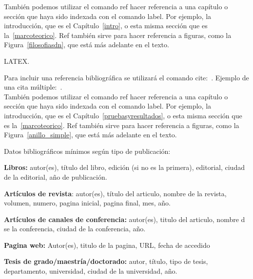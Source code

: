 \documentclass[12pt,a4paper,oneside]{book}
\begin{document}
También podemos utilizar el comando ref hacer referencia a una capítulo o sección que haya sido indexada con el comando label. Por ejemplo, la introducción, que es el Capítulo~\ref{intro}, o esta misma sección que es la~\ref{marcoteorico}. Ref también sirve para hacer referencia a  figuras, como la Figura~\ref{filosofiasdn}, que está más adelante en el texto.

LATEX.

Para incluir una referencia bibliográfica se utilizará el comando cite:~\cite{girard1989}.
Ejemplo de una cita múltiple:~\cite{ranta2012,tcs2015}.\\

También podemos utilizar el comando ref hacer referencia a una capítulo o sección que haya sido indexada con el comando label. Por ejemplo, la introducción, que es el Capítulo~\ref{pruebasyresultados}, o esta misma sección que es la~\ref{marcoteorico}. Ref también sirve para hacer referencia a figuras, como la Figura~\ref{anillo_simple}, que está más adelante en el texto.




\renewcommand{\bibname}{Referencias bibliográficas} 



Datos bibliográficos mínimos según tipo de publicación:

\textbf{Libros:} autor(es), título del libro, edición (si no es la primera), editorial, ciudad de la editorial, año de publicación.

\textbf{Artículos de revista}: autor(es), título del articulo, nombre de la revista, volumen, numero, pagina inicial, pagina final, mes, año.

\textbf{Artículos de canales de conferencia:} autor(es), titulo del articulo, nombre d se la conferencia, ciudad de la conferencia, año.

\textbf{Pagina web:} Autor(es), titulo de la pagina, URL, fecha de accedido

\textbf{Tesis de grado/maestría/doctorado:} autor, título, tipo de tesis, departamento, universidad, ciudad de la universidad, año.


\appendix %
\end{document}
